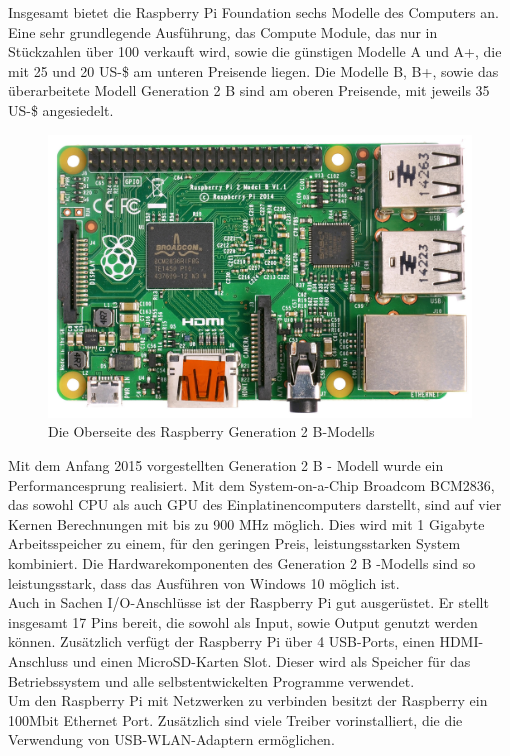 Insgesamt bietet die Raspberry Pi Foundation sechs Modelle des Computers an. Eine sehr grundlegende Ausführung, das Compute Module, das nur in Stückzahlen über 100 verkauft wird, sowie die günstigen Modelle A und A+, die mit 25 und 20 US-\$ am unteren Preisende liegen. Die Modelle B, B+, sowie das überarbeitete Modell Generation 2 B sind am oberen Preisende, mit jeweils 35 US-\$ angesiedelt. \\

\begin{figure}[H] 
	\centering
	\includegraphics[scale=0.5]{Bilder/raspberry2top}
	\caption{Die Oberseite des Raspberry Generation 2 B-Modells\cite{i:raspberry2top}}
	\label{f:raspberry2top}
\end{figure}

Mit dem Anfang 2015 vorgestellten Generation 2 B - Modell wurde ein Performancesprung realisiert. 
Mit dem System-on-a-Chip Broadcom BCM2836, das sowohl CPU als auch GPU des Einplatinencomputers darstellt, sind auf vier Kernen Berechnungen mit bis zu 900 \ac{MHz} möglich. Dies wird mit 1 Gigabyte Arbeitsspeicher zu einem, für den geringen Preis, leistungsstarken System kombiniert.
Die Hardwarekomponenten des Generation 2 B -Modells sind so leistungsstark, dass das Ausführen von Windows 10 möglich ist.\\

Auch in Sachen I/O-Anschlüsse ist der Raspberry Pi gut ausgerüstet. Er stellt insgesamt 17 Pins bereit, die sowohl als Input, sowie Output genutzt werden können. Zusätzlich verfügt der Raspberry Pi über 4 \ac{USB}-Ports, einen HDMI-Anschluss und einen MicroSD-Karten Slot. Dieser wird als Speicher für das Betriebssystem und alle selbstentwickelten Programme verwendet.\\
Um den Raspberry Pi mit Netzwerken zu verbinden besitzt der Raspberry ein 100Mbit Ethernet Port. Zusätzlich sind viele Treiber vorinstalliert, die die Verwendung von USB-WLAN-Adaptern ermöglichen. 


